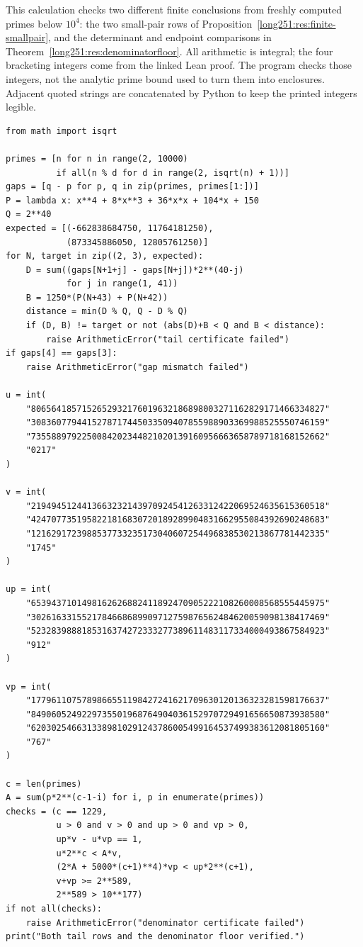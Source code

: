 \documentclass[11pt]{article}
\begin{document}
This calculation checks two different finite conclusions from freshly
computed primes below $10^4$: the two small-pair rows of
Proposition~\ref{long251:res:finite-smallpair}, and the determinant and
endpoint comparisons in Theorem~\ref{long251:res:denominatorfloor}.
All arithmetic is integral; the four bracketing integers come from the
linked Lean proof.  The program checks those integers, not the analytic
prime bound used to turn them into enclosures.  Adjacent quoted strings
are concatenated by Python to keep the printed integers legible.
{\footnotesize
\begin{verbatim}
from math import isqrt

primes = [n for n in range(2, 10000)
          if all(n % d for d in range(2, isqrt(n) + 1))]
gaps = [q - p for p, q in zip(primes, primes[1:])]
P = lambda x: x**4 + 8*x**3 + 36*x*x + 104*x + 150
Q = 2**40
expected = [(-662838684750, 11764181250),
            (873345886050, 12805761250)]
for N, target in zip((2, 3), expected):
    D = sum((gaps[N+1+j] - gaps[N+j])*2**(40-j)
            for j in range(1, 41))
    B = 1250*(P(N+43) + P(N+42))
    distance = min(D % Q, Q - D % Q)
    if (D, B) != target or not (abs(D)+B < Q and B < distance):
        raise ArithmeticError("tail certificate failed")
if gaps[4] == gaps[3]:
    raise ArithmeticError("gap mismatch failed")

u = int(
    "8065641857152652932176019632186898003271162829171466334827"
    "3083607794415278717445033509407855988903369988525550746159"
    "7355889792250084202344821020139160956663658789718168152662"
    "0217"
)

v = int(
    "2194945124413663232143970924541263312422069524635615360518"
    "4247077351958221816830720189289904831662955084392690248683"
    "1216291723988537733235173040607254496838530213867781442335"
    "1745"
)

up = int(
    "6539437101498162626882411892470905222108260008568555445975"
    "3026163315521784668689909712759876562484620059098138417469"
    "5232839888185316374272333277389611483117334000493867584923"
    "912"
)

vp = int(
    "1779611075789866551198427241621709630120136323281598176637"
    "8490605249229735501968764904036152970729491656650873938580"
    "6203025466313389810291243786005499164537499383612081805160"
    "767"
)

c = len(primes)
A = sum(p*2**(c-1-i) for i, p in enumerate(primes))
checks = (c == 1229,
          u > 0 and v > 0 and up > 0 and vp > 0,
          up*v - u*vp == 1,
          u*2**c < A*v,
          (2*A + 5000*(c+1)**4)*vp < up*2**(c+1),
          v+vp >= 2**589,
          2**589 > 10**177)
if not all(checks):
    raise ArithmeticError("denominator certificate failed")
print("Both tail rows and the denominator floor verified.")
\end{verbatim}
}
\end{document}
